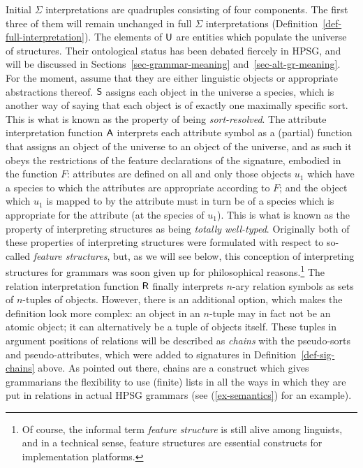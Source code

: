 \documentclass[output=paper,biblatex,babelshorthands,newtxmath,draftmode,colorlinks,citecolor=brown]{langscibook}
\begin{document}
{Initial $\Sigma$ interpretations are quadruples consisting of four
components. The first three of them will remain unchanged in full
$\Sigma$ interpretations (Definition~\ref{def-full-interpretation}). The elements of $\mathsf{U}$
are entities which populate the universe of structures. Their ontological
status has been debated fiercely in HPSG, and will be discussed in
Sections~\ref{sec-grammar-meaning} and~\ref{sec-alt-gr-meaning}. For the
moment, assume that they are either linguistic objects or appropriate
abstractions thereof. $\mathsf{S}$ assigns each object in the universe
a species, which is another way of saying that each object is of exactly
one maximally specific sort. This is what is known as the property of being
\emph{sort-resolved}. The attribute interpretation function $\mathsf{A}$
interprets each attribute symbol as a (partial) function that assigns an
object of the universe to an object of the universe, and as such it
obeys the restrictions of the feature declarations of the signature,
embodied in the function $F$: attributes are defined on all and only
those objects $u_1$ which have a species to which the attributes are appropriate
according to $F$; and the object which $u_1$ is mapped to by the attribute
must in turn be of a species which is appropriate for the attribute
(at the species of $u_1$). %
This is what is known as the property of
interpreting structures as being \emph{totally well-typed}. Originally both
of these properties of interpreting structures were formulated with
respect to so-called \emph{feature structures}, but, as we will see below,
this conception of interpreting structures for grammars
was soon given up for philosophical reasons.\footnote{Of course, the
  informal term \emph{feature structure} is still alive among
  linguists, and in a technical sense, feature structures are essential constructs
  for implementation platforms.} The relation interpretation function
$\mathsf{R}$ finally interprets $n$-ary
relation symbols as sets of $n$-tuples of objects. However, there is
an additional option, which makes the definition look more complex: an
object in an $n$-tuple may in fact not be an atomic object; it can
alternatively be a tuple of objects itself. These tuples in
argument positions of relations will be described as \emph{chains}
with the pseudo-sorts and pseudo-attributes, which were
added to signatures in
Definition~\ref{def-sig-chains} above.  As pointed out there, chains
are a construct which gives grammarians the flexibility to
use (finite) lists in all the ways in which they are put in relations
in actual HPSG grammars (see (\ref{ex-semantics}) for an example). %

}
\end{document}
